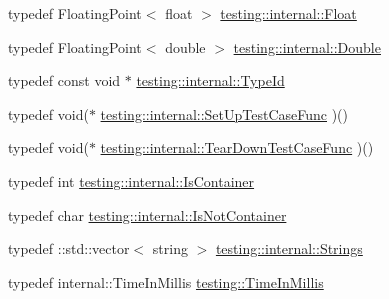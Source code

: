 \begin{DoxyCompactItemize}
typedef Floating\-Point$<$ float $>$ \hyperlink{namespacetesting_1_1internal_a97de600d6dbfffe7091b878ac4b3a9a7}{testing\-::internal\-::\-Float}
\item 
typedef Floating\-Point$<$ double $>$ \hyperlink{namespacetesting_1_1internal_a92debc9f055b7e7e1e4e861c5ae1c67a}{testing\-::internal\-::\-Double}
\item 
typedef const void $\ast$ \hyperlink{namespacetesting_1_1internal_a38c435cbab5f8b784e2e7f3356cab242}{testing\-::internal\-::\-Type\-Id}
\item 
typedef void($\ast$ \hyperlink{namespacetesting_1_1internal_ada14d66b5460b20e09071f51b9885c8d}{testing\-::internal\-::\-Set\-Up\-Test\-Case\-Func} )()
\item 
typedef void($\ast$ \hyperlink{namespacetesting_1_1internal_aad40244621b68546f3b830696225bf9b}{testing\-::internal\-::\-Tear\-Down\-Test\-Case\-Func} )()
\item 
typedef int \hyperlink{namespacetesting_1_1internal_ad8f0c2883245f1df2a53618a49f0deb3}{testing\-::internal\-::\-Is\-Container}
\item 
typedef char \hyperlink{namespacetesting_1_1internal_abf080521ce135deb510e0a7830fd3d33}{testing\-::internal\-::\-Is\-Not\-Container}
\item 
typedef \-::std\-::vector$<$ string $>$ \hyperlink{namespacetesting_1_1internal_a7706b17f05f4b49e351b052ae4e05073}{testing\-::internal\-::\-Strings}
\item 
typedef internal\-::\-Time\-In\-Millis \hyperlink{namespacetesting_a992de1d091ce660f451d1e8b3ce30fd6}{testing\-::\-Time\-In\-Millis}
\end{DoxyCompactItemize}
